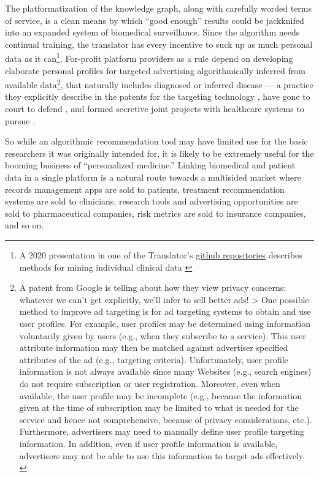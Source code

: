 The platformatization of the knowledge graph, along with carefully
worded terms of service, is a clean means by which ``good enough''
results could be jackknifed into an expanded system of biomedical
surveillance. Since the algorithm needs continual training, the
translator has every incentive to suck up as much personal data as it
can\footnote{A 2020 presentation in one of the Translator's
  \href{https://github.com/NCATSTranslator/Translator-All}{github
  repositories} describes methods for mining individual clinical data
  \citep{translatorconsortiumClinicalDataServices2020} }.
For-profit platform providers as a rule depend on developing elaborate
personal profiles for targeted advertising algorithmically inferred from
available data\footnote{A patent from Google is telling about how they
  view privacy concerns: whatever we can't get explicitly, we'll infer
  to sell better ads! \textgreater{} One possible method to improve ad
  targeting is for ad targeting systems to obtain and use user profiles.
  For example, user profiles may be determined using information
  voluntarily given by users (e.g., when they subscribe to a service).
  This user attribute information may then be matched against advertiser
  specified attributes of the ad (e.g., targeting criteria).
  Unfortunately, user profile information is not always available since
  many Websites (e.g., search engines) do not require subscription or
  user registration. Moreover, even when available, the user profile may
  be incomplete (e.g., because the information given at the time of
  subscription may be limited to what is needed for the service and
  hence not comprehensive, because of privacy considerations, etc.).
  Furthermore, advertisers may need to manually define user profile
  targeting information. In addition, even if user profile information
  is available, advertisers may not be able to use this information to
  target ads effectively. \citep{bharatGeneratingUserInformation2005} }, that naturally includes diagnosed or inferred disease --- a
practice they explicitly describe in the patents for the targeting
technology\citep{bharatGeneratingUserInformation2005} , have gone
to court to defend \citep{SmithFacebookInc2018, krashinskyGoogleBrokeCanada2014} , and formed secretive joint
projects with healthcare systems to pursue \citep{bourreauGoogleFitbitWill2020} .

So while an algorithmic recommendation tool may have limited use for the
basic researchers it was originally intended for, it is likely to be
extremely useful for the booming business of ``personalized medicine.''
Linking biomedical and patient data in a single platform is a natural
route towards a multisided market where records management apps are sold
to patients, treatment recommendation systems are sold to clinicians,
research tools and advertising opportunities are sold to pharmaceutical
companies, risk metrics are sold to insurance companies, and so on.

